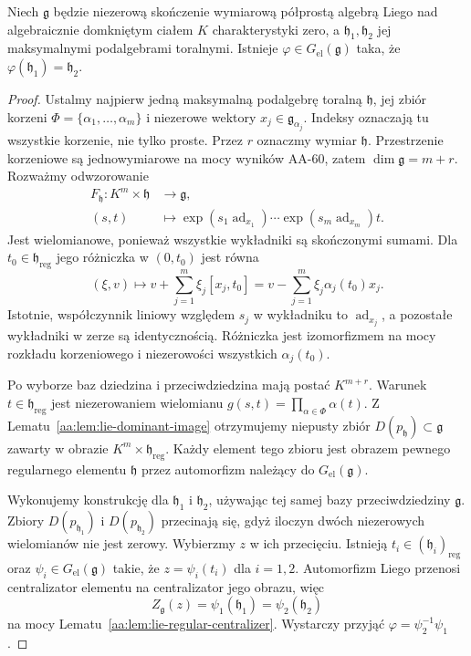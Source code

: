 \begin{twierdzenie}
\label{aa:tw:lie-conjugate-toral}
Niech $\mathfrak g$ będzie niezerową skończenie wymiarową półprostą algebrą Liego nad algebraicznie domkniętym ciałem $K$ charakterystyki zero, a $\mathfrak h_1,\mathfrak h_2$ jej maksymalnymi podalgebrami toralnymi. Istnieje $\varphi\in G_{\mathrm{el}}(\mathfrak g)$ taka, że $\varphi(\mathfrak h_1)=\mathfrak h_2$.
\end{twierdzenie}
\begin{proof}
Ustalmy najpierw jedną maksymalną podalgebrę toralną $\mathfrak h$, jej zbiór korzeni $\Phi=\{\alpha_1,\ldots,\alpha_m\}$ i niezerowe wektory $x_j\in\mathfrak g_{\alpha_j}$. Indeksy oznaczają tu wszystkie korzenie, nie tylko proste. Przez $r$ oznaczmy wymiar $\mathfrak h$. Przestrzenie korzeniowe są jednowymiarowe na mocy wyników AA-60, zatem $\dim\mathfrak g=m+r$. Rozważmy odwzorowanie
\[
\begin{split}
 F_{\mathfrak h}:K^m\times\mathfrak h&\longrightarrow\mathfrak g,\\
 (s,t)&\longmapsto
 \exp(s_1\operatorname{ad}_{x_1})\cdots
 \exp(s_m\operatorname{ad}_{x_m})t.
\end{split}
\]
Jest wielomianowe, ponieważ wszystkie wykładniki są skończonymi sumami. Dla $t_0\in\mathfrak h_{\mathrm{reg}}$ jego różniczka w $(0,t_0)$ jest równa
\[
 (\xi,v)\longmapsto
 v+\sum_{j=1}^m \xi_j[x_j,t_0]
 =v-\sum_{j=1}^m\xi_j\alpha_j(t_0)x_j.
\]
Istotnie, współczynnik liniowy względem $s_j$ w wykładniku to $\operatorname{ad}_{x_j}$, a pozostałe wykładniki w zerze są identycznością. Różniczka jest izomorfizmem na mocy rozkładu korzeniowego i niezerowości wszystkich $\alpha_j(t_0)$.

Po wyborze baz dziedzina i przeciwdziedzina mają postać $K^{m+r}$. Warunek $t\in\mathfrak h_{\mathrm{reg}}$ jest niezerowaniem wielomianu $g(s,t)=\prod_{\alpha\in\Phi}\alpha(t)$. Z Lematu~\ref{aa:lem:lie-dominant-image} otrzymujemy niepusty zbiór $D(p_{\mathfrak h})\subset\mathfrak g$ zawarty w obrazie $K^m\times\mathfrak h_{\mathrm{reg}}$. Każdy element tego zbioru jest obrazem pewnego regularnego elementu $\mathfrak h$ przez automorfizm należący do $G_{\mathrm{el}}(\mathfrak g)$.

Wykonujemy konstrukcję dla $\mathfrak h_1$ i $\mathfrak h_2$, używając tej samej bazy przeciwdziedziny $\mathfrak g$. Zbiory $D(p_{\mathfrak h_1})$ i $D(p_{\mathfrak h_2})$ przecinają się, gdyż iloczyn dwóch niezerowych wielomianów nie jest zerowy. Wybierzmy $z$ w ich przecięciu. Istnieją $t_i\in(\mathfrak h_i)_{\mathrm{reg}}$ oraz $\psi_i\in G_{\mathrm{el}}(\mathfrak g)$ takie, że $z=\psi_i(t_i)$ dla $i=1,2$. Automorfizm Liego przenosi centralizator elementu na centralizator jego obrazu, więc
\[
 Z_{\mathfrak g}(z)
 =\psi_1(\mathfrak h_1)=\psi_2(\mathfrak h_2)
\]
na mocy Lematu~\ref{aa:lem:lie-regular-centralizer}. Wystarczy przyjąć $\varphi=\psi_2^{-1}\psi_1$.
\end{proof}

